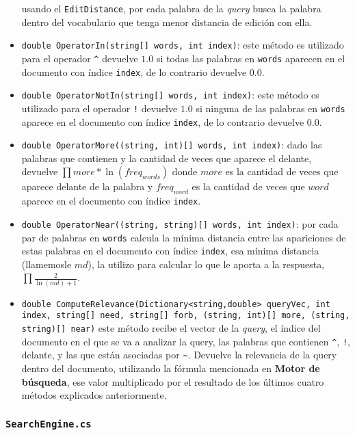 \documentclass[a4paper, 12pt]{report}
\begin{document}
\begin{itemize}
	      usando el {\tt EditDistance}, por cada palabra de la {\it query} busca la palabra dentro del vocabulario que tenga menor distancia de edición con ella.
	\item {\tt double OperatorIn(string[] words, int index)}: este método es utilizado para el operador {\tt \^{}} devuelve $1.0$ si todas las palabras en {\tt words}
	      aparecen en el documento con índice {\tt index}, de lo contrario devuelve $0.0$.
	\item {\tt double OperatorNotIn(string[] words, int index)}: este método es utilizado para el operador {\tt !} devuelve $1.0$ si ninguna de las palabras en {\tt words}
	      aparece en el documento con índice {\tt index}, de lo contrario devuelve $0.0$.
	\item {\tt double OperatorMore((string, int)[] words, int index)}: dado las palabras que contienen {\tt *} y la cantidad de veces que aparece el {\tt *} delante, devuelve $\prod more * \ln(freq_{words})$ donde $more$ es la cantidad de veces que {\tt *} aparece delante de la palabra y $freq_{word}$ es la cantidad de veces que $word$ aparece en el documento con índice {\tt index}.
	\item {\tt double OperatorNear((string, string)[] words, int index)}: por cada par de palabras en {\tt words} calcula la mínima distancia entre las apariciones de estas palabras en el documento con índice {\tt index}, esa mínima distancia (llamemosle $md$), la utilizo para calcular lo que le aporta a la respuesta, $\prod \frac{2}{\ln(md) + 1}$.
	\item {\tt double ComputeRelevance(Dictionary<string,double> queryVec, int index, string[] need, string[] forb, (string, int)[] more, (string, string)[] near)} este método recibe el vector de la {\it query}, el índice del documento en el que se va a analizar la query, las palabras que contienen {\tt \^{}}, {\tt !}, {\tt *} delante, y las que están asociadas por {\tt \~{}}. Devuelve la relevancia de la query dentro del documento, utilizando la fórmula mencionada en {\bf Motor de búsqueda}, ese valor multiplicado por el resultado de los últimos cuatro métodos explicados anteriormente.
\end{itemize}

\subsubsection*{\tt SearchEngine.cs}
\end{document}
